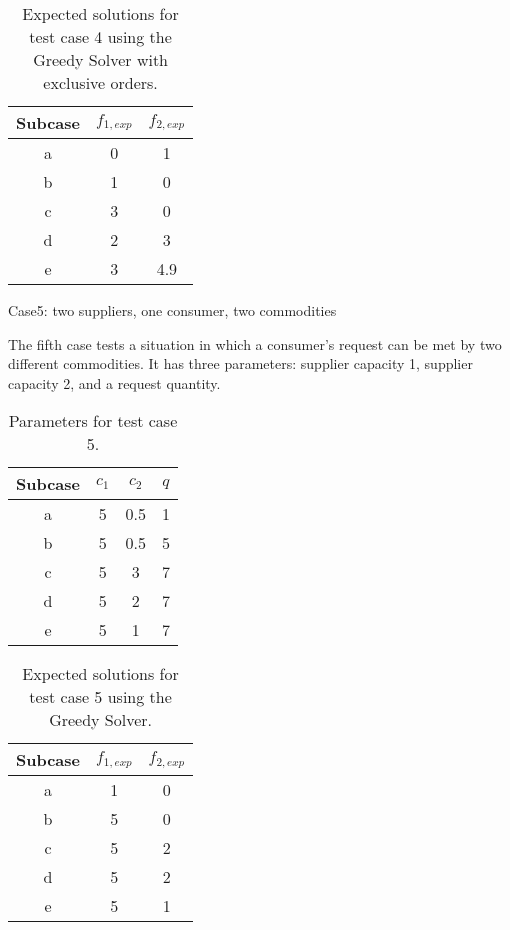 \begin{table}[ht]
  \begin{center}
    \caption{Expected solutions for test case 4 using the Greedy Solver with 
      exclusive orders.}
    \begin{tabular}{ccc}
    \toprule
    Subcase & $f_{1, exp}$ & $f_{2, exp}$\\
    \midrule
    a & 0  & 1   \\
    b & 1  & 0   \\
    c & 3  & 0   \\
    d & 2  & 3   \\
    e & 3  & 4.9 \\
    \bottomrule
    \end{tabular}
  \end{center}
\end{table}

Case5: two suppliers, one consumer, two commodities

The fifth case tests a situation in which a consumer's request can be met by two
different commodities. It has three parameters: supplier capacity 1, supplier
capacity 2, and a request quantity.

\begin{table}[ht]
  \begin{center}
    \caption{Parameters for test case 5.}
    \begin{tabular}{cccc}
    \toprule
    Subcase & $c_1$ & $c_2$ & $q$ \\
    \midrule
    a & 5  & 0.5 & 1 \\
    b & 5  & 0.5 & 5 \\
    c & 5  & 3   & 7 \\
    d & 5  & 2   & 7 \\
    e & 5  & 1   & 7 \\
    \bottomrule
    \end{tabular}
  \end{center}
\end{table}

\begin{table}[ht]
  \begin{center}
    \caption{Expected solutions for test case 5 using the Greedy Solver.}
    \begin{tabular}{ccc}
    \toprule
    Subcase & $f_{1, exp}$ & $f_{2, exp}$\\
    \midrule
    a & 1  & 0   \\
    b & 5  & 0   \\
    c & 5  & 2   \\
    d & 5  & 2   \\
    e & 5  & 1   \\
    \bottomrule
    \end{tabular}
  \end{center}
\end{table}


